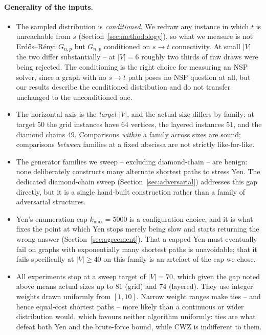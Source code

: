 \paragraph{Generality of the inputs.}
\begin{itemize}
  \item The sampled distribution is \emph{conditioned}. We redraw any
    instance in which $t$ is unreachable from $s$
    (Section~\ref{sec:methodology}), so what we measure is not
    Erd\H{o}s--R\'enyi $G_{n,p}$ but $G_{n,p}$ conditioned on $s\to t$
    connectivity. At small $|V|$ the two differ substantially -- at
    $|V|=6$ roughly two thirds of raw draws were being rejected. The
    conditioning is the right choice for measuring an NSP solver, since
    a graph with no $s\to t$ path poses no NSP question at all, but our
    results describe the conditioned distribution and do not transfer
    unchanged to the unconditioned one.
  \item The horizontal axis is the \emph{target} $|V|$, and the actual
    size differs by family: at target $50$ the grid instances have $64$
    vertices, the layered instances $51$, and the diamond chains $49$.
    Comparisons \emph{within} a family across sizes are sound;
    comparisons \emph{between} families at a fixed abscissa are not
    strictly like-for-like.
  \item The generator families we sweep -- excluding diamond-chain --
    are benign: none deliberately constructs many alternate shortest
    paths to stress Yen. The dedicated diamond-chain sweep
    (Section~\ref{sec:adversarial}) addresses this gap directly, but it
    is a single hand-built construction rather than a family of
    adversarial structures.
  \item Yen's enumeration cap $k_{\max}=5000$ is a configuration choice,
    and it is what fixes the point at which Yen stops merely being slow
    and starts returning the wrong answer (Section~\ref{sec:agreement}).
    That a capped Yen must eventually fail on graphs with exponentially
    many shortest paths is unavoidable; that it fails specifically at
    $|V|\ge 40$ on this family is an artefact of the cap we chose.
  \item All experiments stop at a sweep target of $|V|=70$, which given the
    gap noted above means actual sizes up to $81$ (grid) and $74$ (layered).
    They use integer weights drawn
    uniformly from $[1,10]$. Narrow weight ranges make ties -- and hence
    equal-cost shortest paths -- more likely than a continuous or wider
    distribution would, which favours neither algorithm uniformly: ties
    are what defeat both Yen and the brute-force bound, while CWZ is
    indifferent to them.
\end{itemize}
